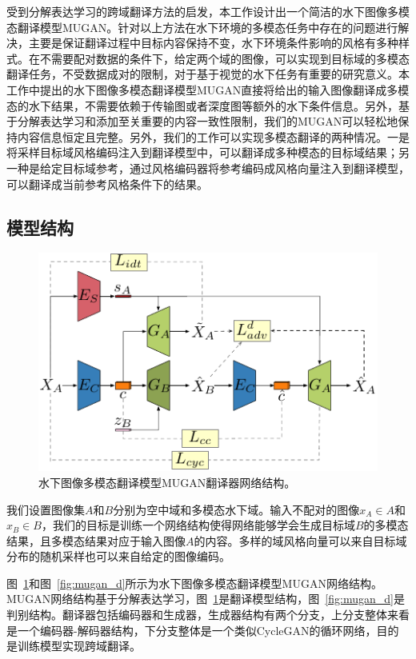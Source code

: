 受到分解表达学习的跨域翻译方法的启发，本工作设计出一个简洁的水下图像多模态翻译模型MUGAN。针对以上方法在水下环境的多模态任务中存在的问题进行解决，主要是保证翻译过程中目标内容保持不变，水下环境条件影响的风格有多种样式。在不需要配对数据的条件下，给定两个域的图像，可以实现到目标域的多模态翻译任务，不受数据成对的限制，对于基于视觉的水下任务有重要的研究意义。本工作中提出的水下图像多模态翻译模型MUGAN直接将给出的输入图像翻译成多模态的水下结果，不需要依赖于传输图或者深度图等额外的水下条件信息。另外，基于分解表达学习和添加至关重要的内容一致性限制，我们的MUGAN可以轻松地保持内容信息恒定且完整。另外，我们的工作可以实现多模态翻译的两种情况。一是将采样目标域风格编码注入到翻译模型中，可以翻译成多种模态的目标域结果；另一种是给定目标域参考，通过风格编码器将参考编码成风格向量注入到翻译模型，可以翻译成当前参考风格条件下的结果。

\subsection{模型结构}

\begin{figure}[ht]
    \centering
    \includegraphics[width=1\textwidth]{figures/G.pdf}
    \caption{水下图像多模态翻译模型MUGAN翻译器网络结构。}
    \label{fig:mugan_g}
\end{figure}

我们设置图像集$A$和$B$分别为空中域和多模态水下域。输入不配对的图像$x_A \in A$和$x_B \in B$，我们的目标是训练一个网络结构使得网络能够学会生成目标域$B$的多模态结果，且多模态结果对应于输入图像$A$的内容。多样的域风格向量可以来自目标域分布的随机采样也可以来自给定的图像编码。

图~\ref{fig:mugan_g}和图~\ref{fig:mugan_d}所示为水下图像多模态翻译模型MUGAN网络结构。MUGAN网络结构基于分解表达学习，图~\ref{fig:mugan_g}是翻译模型结构，图~\ref{fig:mugan_d}是判别结构。翻译器包括编码器和生成器，生成器结构有两个分支，上分支整体来看是一个编码器-解码器结构，下分支整体是一个类似CycleGAN的循环网络，目的是训练模型实现跨域翻译。

